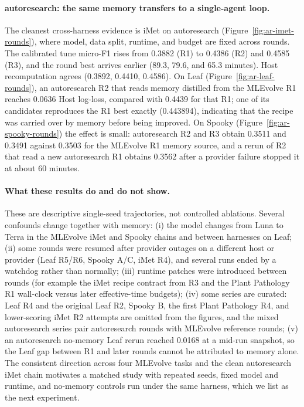 \paragraph{autoresearch: the same memory transfers to a single-agent loop.}
The cleanest cross-harness evidence is iMet on autoresearch
(Figure~\ref{fig:ar-imet-rounds}), where model, data split, runtime, and budget
are fixed across rounds.  The calibrated tune micro-F1 rises from 0.3882 (R1)
to 0.4386 (R2) and 0.4585 (R3), and the round best arrives earlier
(89.3, 79.6, and 65.3 minutes).  Host recomputation agrees
(0.3892, 0.4410, 0.4586).  On Leaf (Figure~\ref{fig:ar-leaf-rounds}), an
autoresearch R2 that reads memory distilled from the MLEvolve R1 reaches
0.0636 Host log-loss, compared with 0.4439 for that R1; one of its candidates
reproduces the R1 best exactly (0.443894), indicating that the recipe was
carried over by memory before being improved.  On Spooky
(Figure~\ref{fig:ar-spooky-rounds}) the effect is small: autoresearch R2 and R3
obtain 0.3511 and 0.3491 against 0.3503 for the MLEvolve R1 memory source,
and a rerun of R2 that read a new autoresearch R1 obtains 0.3562 after a
provider failure stopped it at about 60 minutes.

\paragraph{What these results do and do not show.}
These are descriptive single-seed trajectories, not controlled ablations.
Several confounds change together with memory:
(i) the model changes from Luna to Terra in the MLEvolve iMet and Spooky
chains and between harnesses on Leaf;
(ii) some rounds were resumed after provider outages on a different host or
provider (Leaf R5/R6, Spooky A/C, iMet R4), and several runs ended by a
watchdog rather than normally;
(iii) runtime patches were introduced between rounds (for example the iMet
recipe contract from R3 and the Plant Pathology R1 wall-clock versus later
effective-time budgets);
(iv) some series are curated: Leaf R4 and the original Leaf R2, Spooky B, the
first Plant Pathology R4, and lower-scoring iMet R2 attempts are omitted from
the figures, and the mixed autoresearch series pair autoresearch rounds with
MLEvolve reference rounds;
(v) an autoresearch no-memory Leaf rerun reached 0.0168 at a mid-run snapshot,
so the Leaf gap between R1 and later rounds cannot be attributed to memory
alone.
The consistent direction across four MLEvolve tasks and the clean
autoresearch iMet chain motivates a matched study with repeated seeds, fixed
model and runtime, and no-memory controls run under the same harness, which we
list as the next experiment.

